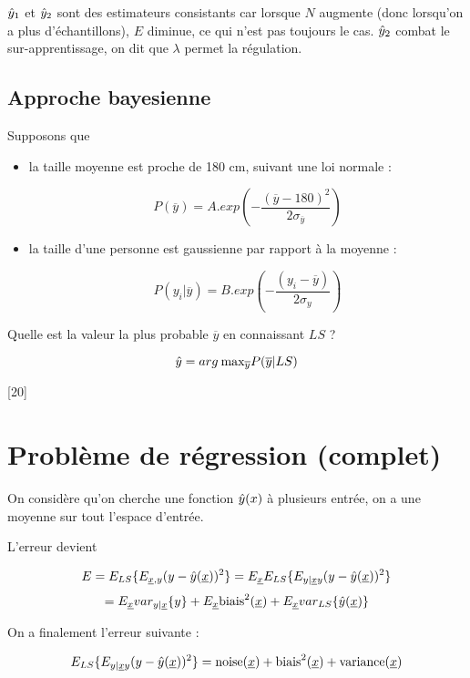 	$\hat{y}_1$ et $\hat{y}_2$ sont des estimateurs consistants car lorsque $N$ augmente (donc lorsqu'on a plus d'échantillons), $E$ diminue, ce qui n'est pas toujours le cas. $\hat{y}_2$ combat le sur-apprentissage, on dit que $\lambda$ permet la régulation.
	
	
		\newcommand{\pyb}{P(\overline{y})}
		\newcommand{\yb}{\overline{y}}
		\subsection{Approche bayesienne}
		
		Supposons que
		
		\begin{itemize}
			\item la taille moyenne est proche de 180 cm, suivant une loi normale :
			
			$$\pyb = A.exp(- \frac{(\yb - 180)^2}{2 \sigma_{\yb}})$$
			
			\item la taille d'une personne est gaussienne par rapport à la moyenne :
			
			$$P(y_i \vert \yb ) = B.exp(- \frac{(y_i - \yb)}{2 \sigma_y})$$
		\end{itemize}
		
		Quelle est la valeur la plus probable $\yb$ en connaissant $LS$ ?
		
		$$\yh = arg \: \text{max}_{\yb} P(\yb \vert LS)$$
		
		[20]
	
	\section{Problème de régression (complet)}
	
	On considère qu'on cherche une fonction $\hat{y}(x)$ à plusieurs entrée, on a une moyenne sur tout l'espace d'entrée.
	
	L'erreur devient
	
	\newcommand{\exy}{E_{\underline{x}, y}}
	\newcommand{\eyx}{E_{y \vert \underline{x}y}}
	\newcommand{\ex}{E_{\underline{x}}}
	\newcommand{\xu}{\underline{x}}
	
	$$E = \els{\exy{(y - \yh(\xu))^2}} = \ex{\els{\eyx{(y - \yh(\xu))^2}}}$$
	$$= \ex{\varyx{y}} + \ex{\text{biais}^2(\xu)} + \ex{\varls{\yh(\xu)}}$$
	
	On a finalement l'erreur suivante :
	
	$$\els{\eyx{(y - \yh(\xu))^2}} = \text{noise}(\xu) + \text{biais}^2(\xu) + \text{variance}(\xu)$$
	
